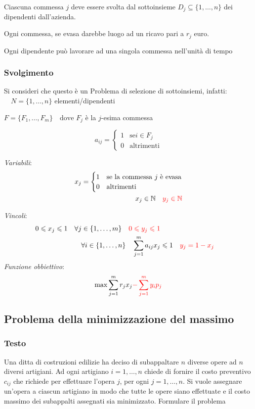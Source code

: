 Ciascuna commessa $j$ deve essere svolta dal sottoinsieme $D_j\subseteq\{1,\dots, n\}$ dei dipendenti dall'azienda. 

Ogni commessa, se evasa darebbe luogo ad un ricavo pari a $r_j$ euro.

Ogni dipendente può lavorare ad una singola commessa nell'unità di tempo 

\subsubsection{Svolgimento}
Si consideri che questo è un Problema di selezione di sottoinsiemi, infatti:
$\quad N=\{1,\dots,n\}$ elementi/dipendenti

$F = \{F_1, \dots, F_m\} \quad \text{dove } F_j$ è la $j$-esima commessa

\[
    a_{ij}= \begin{cases}
        1 & \text{se} i\in F_j\\
        0 & \text{altrimenti}
    \end{cases}
\]

\textit{Variabili}:
\[
    \begin{aligned}
        x_j= \begin{cases}
            1 & \text{se la commessa $j$ è evasa}\\
            0 & \text{altrimenti}
        \end{cases}\\
        x_j\in\mathbb{N} \quad \textcolor{red}{y_j\in\mathbb{N}}
    \end{aligned}
\]

\textit{Vincoli}:
\[
    \begin{aligned}
        0\leqslant x_j\leqslant 1 \quad \forall j\in\{1,\dots,m\} \quad \textcolor{red}{0\leqslant y_j\leqslant 1}\\
        \forall i\in\{1,\dots,n\}\quad \sum^m_{j=1}a_{ij}x_j &\leqslant 1 \quad \textcolor{red}{y_j=1-x_j}
    \end{aligned}
\]
\textit{Funzione obbiettivo}:
\[
    \max \sum^m_{j=1}r_jx_j \textcolor{red}{-\sum^m_{j=1}y_ip_j}
\]

\subsection{Problema della minimizzazione del massimo}
\subsubsection{Testo}
Una ditta di costruzioni edilizie ha deciso di subappaltare $n$ diverse opere ad $n$ diversi artigiani. Ad ogni artigiano $i = 1,\dots , n$ chiede di fornire il costo preventivo $c_{ij}$ che richiede per effettuare l’opera $j$, per ogni $j = 1, \dots, n$. Si vuole assegnare un’opera a ciascun artigiano in modo che tutte le opere siano effettuate e il costo massimo dei subappalti assegnati sia minimizzato. Formulare il problema

